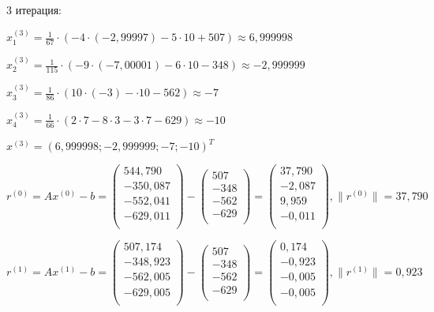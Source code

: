 \documentclass[a4paper,12pt]{article} %
\begin{document}
\begin{enumerate}
3 итерация:

$x_1^{(3)} = \frac{1}{67} \cdot (-4 \cdot (-2,99997) - 5 \cdot 10 + 507) \approx 6,999998$

$x_2^{(3)} = \frac{1}{115} \cdot (-9 \cdot (-7,00001) - 6 \cdot 10 - 348) \approx -2,999999$

$x_3^{(3)} = \frac{1}{86} \cdot (10 \cdot (-3) - \cdot 10 - 562) \approx -7$

$x_4^{(3)} = \frac{1}{66} \cdot (2 \cdot 7 - 8 \cdot 3 - 3 \cdot 7 - 629) \approx -10$

$x^{(3)} = (6,999998; -2,999999; -7; -10)^T$

\begin{equation*}
    r^{(0)} = Ax^{(0)} - b =
    \begin{pmatrix}
        544,790 \\
        -350,087 \\
        -552,041 \\
        -629,011 \\
    \end{pmatrix}
    -
    \begin{pmatrix}
        507 \\
        -348 \\
        -562 \\
        -629 \\
    \end{pmatrix}
    =
    \begin{pmatrix}
        37,790 \\
        -2,087 \\
        9,959 \\
        -0,011 \\
    \end{pmatrix}
    , \|r^{(0)}\| = 37,790
\end{equation*}

\begin{equation*}
    r^{(1)} = Ax^{(1)} - b =
    \begin{pmatrix}
        507,174 \\
        -348,923 \\
        -562,005 \\
        -629,005 \\
    \end{pmatrix}
    -
    \begin{pmatrix}
        507 \\
        -348 \\
        -562 \\
        -629 \\
    \end{pmatrix}
    =
    \begin{pmatrix}
        0,174 \\
        -0,923 \\
        -0,005 \\
        -0,005 \\
    \end{pmatrix}
    , \|r^{(1)}\| = 0,923
\end{equation*}


\end{enumerate}
\end{document}
